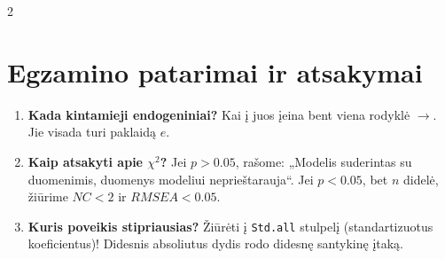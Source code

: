 \documentclass[9pt,a4paper]{article}
\begin{document}
\begin{multicols*}{2}
\section{Egzamino patarimai ir atsakymai}
\begin{enumerate}
    \item \textbf{Kada kintamieji endogeniniai?} Kai į juos įeina bent viena rodyklė $\to$. Jie visada turi paklaidą $e$.
    \item \textbf{Kaip atsakyti apie $\chi^2$?}
    Jei $p > 0.05$, rašome: „Modelis suderintas su duomenimis, duomenys modeliui neprieštarauja“. Jei $p < 0.05$, bet $n$ didelė, žiūrime $NC < 2$ ir $RMSEA < 0.05$.
    \item \textbf{Kuris poveikis stipriausias?}
    Žiūrėti į \texttt{Std.all} stulpelį (standartizuotus koeficientus)! Didesnis absoliutus dydis rodo didesnę santykinę įtaką.
\end{enumerate}

\end{multicols*}
\end{document}
